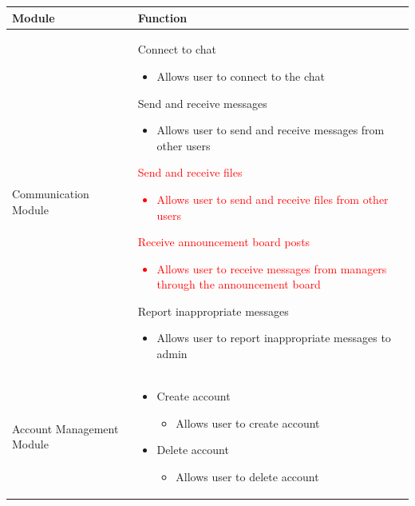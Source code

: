 \documentclass[]{article}
\begin{document}
\begin{center}
	\begin{tabular}{| p{4cm} | p{13cm} |}
		\hline
		\textbf{Module}           & \textbf{Function}                   \\
		\hline
		Communication Module      &
		\begin{itemize}
			\item Connect to chat
			      \begin{itemize}
				      \item Allows user to connect to the chat
			      \end{itemize}
			\item Send and receive messages
			      \begin{itemize}
				      \item Allows user to send and receive messages from other users
			      \end{itemize}
			\item[\textcolor{red}{•}] \textcolor{red}{Send and receive files
				\begin{itemize}
					\item Allows user to send and receive files from other users
				\end{itemize}
			\item Receive announcement board posts
			      \begin{itemize}
				      \item Allows user to receive messages from managers through the announcement board
			      \end{itemize}
			      }
			\item Report inappropriate messages
			      \begin{itemize}
				      \item Allows user to report inappropriate messages to admin
			      \end{itemize}
		\end{itemize} \\
		\hline
		Account Management Module &
		\begin{itemize}
			\item Create account
			      \begin{itemize}
				      \item Allows user to create account
			      \end{itemize}
			\item Delete account
			      \begin{itemize}
				      \item Allows user to delete account

\end{itemize}
\end{itemize}
\end{tabular}
\end{center}
\end{document}
